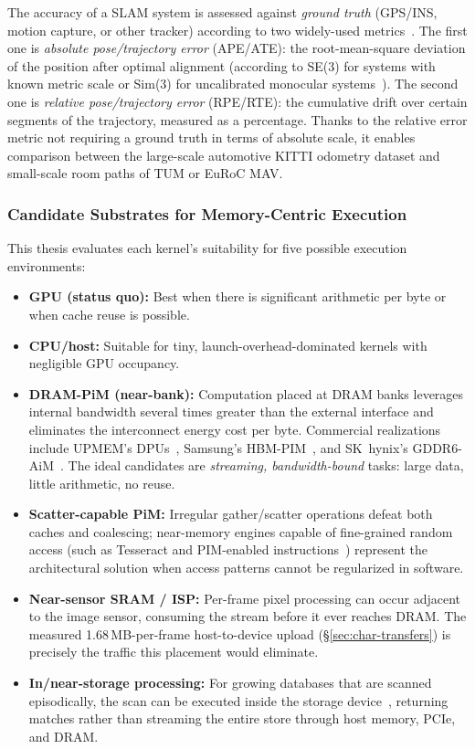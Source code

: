 The accuracy of a SLAM system is assessed against \emph{ground truth} (GPS/INS, motion capture, or other tracker) according to two widely-used metrics~\cite{sturm2012tum,zhang2018tutorial}. The first one is \emph{absolute pose/trajectory error} (APE/ATE): the root-mean-square deviation of the position after optimal alignment (according to SE(3) for systems with known metric scale or Sim(3) for uncalibrated monocular systems~\cite{umeyama1991}). The second one is \emph{relative pose/trajectory error} (RPE/RTE): the cumulative drift over certain segments of the trajectory, measured as a percentage. Thanks to the relative error metric not requiring a ground truth in terms of absolute scale, it enables comparison between the large-scale automotive KITTI odometry dataset and small-scale room paths of TUM or EuRoC MAV.

\subsubsection{Candidate Substrates for Memory-Centric Execution}
\label{sec:bg-substrates}

This thesis evaluates each kernel's suitability for five possible execution environments:

\begin{itemize}
\item \textbf{GPU (status quo):} Best when there is significant arithmetic per byte or when cache reuse is possible.
\item \textbf{CPU/host:} Suitable for tiny, launch-overhead-dominated kernels with negligible GPU occupancy.
\item \textbf{DRAM-PiM (near-bank):} Computation placed at DRAM banks leverages internal bandwidth several times greater than the external interface and eliminates the interconnect energy cost per byte. Commercial realizations include UPMEM's DPUs~\cite{gomezluna2021upmem}, Samsung's HBM-PIM~\cite{kwon2021hbmpim}, and SK~hynix's GDDR6-AiM~\cite{lee2022aim}. The ideal candidates are \emph{streaming, bandwidth-bound} tasks: large data, little arithmetic, no reuse.
\item \textbf{Scatter-capable PiM:} Irregular gather/scatter operations defeat both caches and coalescing; near-memory engines capable of fine-grained random access (such as Tesseract and PIM-enabled instructions~\cite{ahn2015tesseract,ahn2015pei}) represent the architectural solution when access patterns cannot be regularized in software.
\item \textbf{Near-sensor SRAM / ISP:} Per-frame pixel processing can occur adjacent to the image sensor, consuming the stream before it ever reaches DRAM. The measured 1.68\,MB-per-frame host-to-device upload (\S\ref{sec:char-transfers}) is precisely the traffic this placement would eliminate.
\item \textbf{In/near-storage processing:} For growing databases that are scanned episodically, the scan can be executed inside the storage device~\cite{do2013smartssd,gu2016biscuit}, returning matches rather than streaming the entire store through host memory, PCIe, and DRAM.
\end{itemize}

